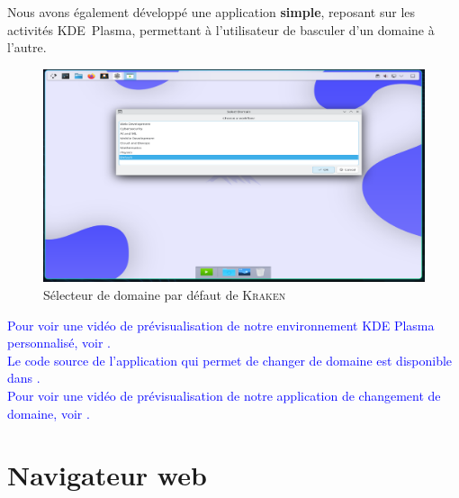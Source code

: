 Nous avons également développé une application \textbf{simple}, reposant sur les activités KDE Plasma, permettant à l’utilisateur de basculer d’un domaine à l’autre.\\

\begin{figure}[H]
  \centering
  \includegraphics[width=1\textwidth]{images_pfe/defaultswitcher.png}
  \caption{Sélecteur de domaine par défaut de \textsc{Kraken}}
  \label{fig:dks}
\end{figure}

\textcolor{blue}{Pour voir une vidéo de prévisualisation de notre environnement KDE Plasma personnalisé, voir \cite{kde_preview}.}\\

\textcolor{blue}{Le code source de l’application qui permet de changer de domaine est disponible dans \cite{switch_domaine}.}\\
\textcolor{blue}{Pour voir une vidéo de prévisualisation de notre application de changement de domaine, voir \cite{kraken_doamin_switcher}.}\\





 \clearpage

\section{Navigateur web}
\label{subsec:web-browser}

